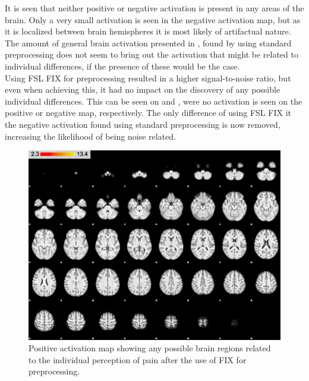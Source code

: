 It is seen that neither positive or negative activation is present in any areas of the brain. Only a very small activation is seen in the negative activation map, but as it is localized between brain hemispheres it is most likely of artifactual nature. The amount of general brain activation presented in , found by using standard preprocessing does not seem to bring out the activation that might be related to individual differences, if the presence of these would be the case. \\
Using FSL FIX for preprocessing resulted in a higher signal-to-noise ratio, but even when achieving this, it had no impact on the discovery of any possible individual differences. This can be seen on  and , were no activation is seen on the positive or negative map, respectively. The only difference of using FSL FIX it the negative activation found using standard preprocessing is now removed, increasing the likelihood of being noise related. 

\begin{figure}[H]                 
	\includegraphics[width=.65\textwidth]{figures/Results/FIX_pos_ID}  
	\caption{Positive activation map showing any possible brain regions related to the individual perception of pain after the use of FIX for preprocessing.}
	\label{FIX_pos_ID} 
\end{figure}

